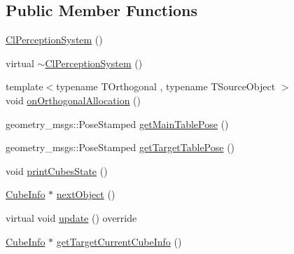 \subsection*{Public Member Functions}
\begin{DoxyCompactItemize}
\item 
\hyperlink{classsm__fetch__two__table__whiskey__pour_1_1cl__perception__system_1_1ClPerceptionSystem_a9e9fb07585c1d7b3a4254611c6fe4cff}{Cl\+Perception\+System} ()
\item 
virtual \hyperlink{classsm__fetch__two__table__whiskey__pour_1_1cl__perception__system_1_1ClPerceptionSystem_ac069efb7c379c915521f36d57d5f999d}{$\sim$\+Cl\+Perception\+System} ()
\item 
{\footnotesize template$<$typename T\+Orthogonal , typename T\+Source\+Object $>$ }\\void \hyperlink{classsm__fetch__two__table__whiskey__pour_1_1cl__perception__system_1_1ClPerceptionSystem_a85ee6e45e46bf2e6c41bb8b6a2954ddf}{on\+Orthogonal\+Allocation} ()
\item 
geometry\+\_\+msgs\+::\+Pose\+Stamped \hyperlink{classsm__fetch__two__table__whiskey__pour_1_1cl__perception__system_1_1ClPerceptionSystem_a405a056a25bc0818b3e490eeeeeef98d}{get\+Main\+Table\+Pose} ()
\item 
geometry\+\_\+msgs\+::\+Pose\+Stamped \hyperlink{classsm__fetch__two__table__whiskey__pour_1_1cl__perception__system_1_1ClPerceptionSystem_a2deba9a5465a6223d40c0f1028c31fe6}{get\+Target\+Table\+Pose} ()
\item 
void \hyperlink{classsm__fetch__two__table__whiskey__pour_1_1cl__perception__system_1_1ClPerceptionSystem_a82afda9f4a97f212313b5912206e03a4}{print\+Cubes\+State} ()
\item 
\hyperlink{structsm__fetch__two__table__whiskey__pour_1_1cl__perception__system_1_1CubeInfo}{Cube\+Info} $\ast$ \hyperlink{classsm__fetch__two__table__whiskey__pour_1_1cl__perception__system_1_1ClPerceptionSystem_af64db2ac7aafc3369f84c02b2a360b28}{next\+Object} ()
\item 
virtual void \hyperlink{classsm__fetch__two__table__whiskey__pour_1_1cl__perception__system_1_1ClPerceptionSystem_a66a8dfad8b4403b5a0f50fecead09410}{update} () override
\item 
\hyperlink{structsm__fetch__two__table__whiskey__pour_1_1cl__perception__system_1_1CubeInfo}{Cube\+Info} $\ast$ \hyperlink{classsm__fetch__two__table__whiskey__pour_1_1cl__perception__system_1_1ClPerceptionSystem_a09899882cdea9c265e98881bb903882b}{get\+Target\+Current\+Cube\+Info} ()

\end{DoxyCompactItemize}

